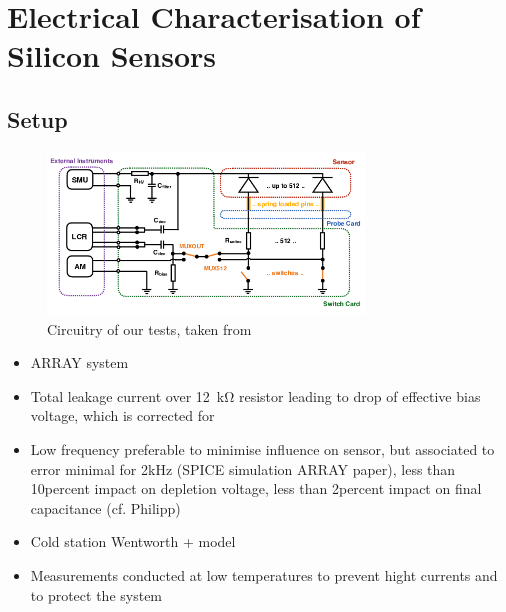 \section{Electrical Characterisation of Silicon Sensors}
\label{sec:setup}

\subsection{Setup}
\label{subsec:setup_principle}

\begin{figure}[h]
	\centering
	\includegraphics[width=0.75\textwidth]{figures/circuit_cards_updated.png}
	\caption{
		Circuitry of our tests, taken from~\cite{pitters:array2019}
	}
	\label{fig:switchprobecard_CAD}
\end{figure}


\begin{itemize}
	\item ARRAY system~\cite{pitters:array2019}
	\item Total leakage current over \SI{12}{\kilo\ohm} resistor leading to drop of effective bias voltage, which is corrected for
	\item Low frequency preferable to minimise influence on sensor, but associated to error minimal for 2kHz (SPICE simulation ARRAY paper), less than 10percent impact on depletion voltage, less than 2percent impact on final capacitance (cf. Philipp)
\end{itemize}

\begin{itemize}
	\item Cold station Wentworth + model
	\item Measurements conducted at low temperatures to prevent hight currents and to protect the system
\end{itemize}




